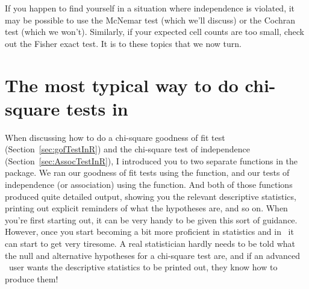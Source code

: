 \noindent
If you happen to find yourself in a situation where independence is violated, it may be possible to use the McNemar test (which we'll discuss) or the Cochran test (which we won't). Similarly, if your expected cell counts are too small, check out the Fisher exact test. It is to these topics that we now turn. 

\section{The most typical way to do chi-square tests in \R\label{sec:chisq.test}}

When discussing how to do a chi-square goodness of fit test (Section~\ref{sec:gofTestInR}) and the chi-square test of independence (Section~\ref{sec:AssocTestInR}), I introduced you to two separate functions in the  package. We ran our goodness of fit tests using the  function, and our tests of independence (or association) using the  function. And both of those functions produced quite detailed output, showing you the relevant descriptive statistics, printing out explicit reminders of what the hypotheses are, and so on. When you're first starting out, it can be very handy to be given this sort of guidance. However, once you start becoming a bit more proficient in statistics and in \R\ it can start to get very tiresome. A real statistician hardly needs to be told what the null and alternative hypotheses for a chi-square test are, and if an advanced \R\ user wants the descriptive statistics to be printed out, they know how to produce them! 


